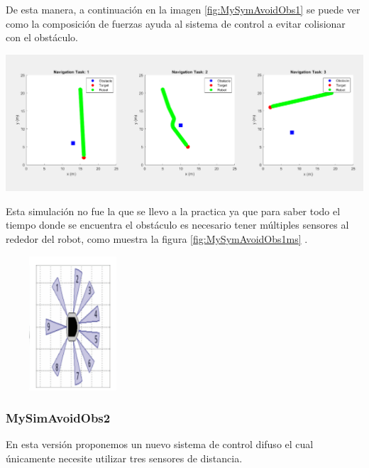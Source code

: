 De esta manera, a continuación en la imagen \ref{fig:MySymAvoidObs1} se puede ver como la composición de fuerzas ayuda al sistema de control a evitar colisionar con el obstáculo.

\begin{center}
    \includegraphics[scale=0.3]{Tesis/Capitulos/04_CAPITULO_2/img/MySimAvoidObs1.png}
    \label{fig:MySymAvoidObs1}
\end{center}

Esta simulación no fue la que se llevo a la practica ya que para saber todo el tiempo donde se encuentra el obstáculo es necesario tener múltiples sensores al rededor del robot, como muestra la figura \ref{fig:MySymAvoidObs1ms} .\par

\begin{center}
    \includegraphics[width=5cm, height=5cm]{Tesis/Capitulos/04_CAPITULO_2/img/robot_multiple_sensors.png}
    \label{fig:MySymAvoidObs1ms}
\end{center}

\subsubsection{MySimAvoidObs2}

En esta versión proponemos un nuevo sistema de control difuso el cual únicamente necesite utilizar tres sensores de distancia.


